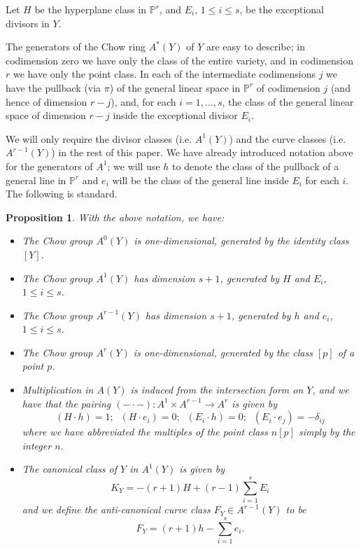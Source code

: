 \documentclass[12pt]{article}
\newtheorem{proposition}[equation]{Proposition}
\numberwithin{equation}{section}
\numberwithin{subeq}{equation}
\def\bbP{\mathbb{P}}
\begin{document}
Let $H$ be the hyperplane class in $\bbP^r$,
and $E_i$, $1 \leq i \leq s$, be the exceptional divisors in $Y$.

The generators of the Chow ring $A^*(Y)$ of $Y$ are easy to describe;
in codimension zero we have only the class of the entire variety,
and in codimension $r$ we have only the point class.
In each of the intermediate codimensions $j$
we have the pullback (via $\pi$) of the general linear space in $\bbP^r$ of codimension $j$
(and hence of dimension $r-j$),
and, for each $i = 1,\ldots,s$,
the class of the general linear space of dimension $r-j$ inside the exceptional divisor $E_i$.

We will only require the divisor classes (i.e. $A^1(Y)$)
and the curve classes (i.e. $A^{r-1}(Y)$) in the rest of this paper.
We have already introduced notation above for the generators of $A^1$;
we will use $h$ to denote the class of the pullback of a general line in $\bbP^r$
and $e_i$ will be the class of the general line inside $E_i$ for each $i$.
The following is standard.

\begin{proposition}\label{antican}
With the above notation, we have:
\begin{itemize}
\item[(a)] The Chow group $A^0(Y)$ is one-dimensional, generated by the identity class $[Y]$.
\item[(b)] The Chow group $A^1(Y)$ has dimension $s+1$, generated by $H$ and $E_i$, $1\leq i \leq s$.
\item[(c)] The Chow group $A^{r-1}(Y)$ has dimension $s+1$, generated by $h$ and $e_i$, $1\leq i \leq s$.
\item[(d)] The Chow group $A^r(Y)$ is one-dimensional, generated by the class $[p]$ of a point $p$.
\item[(f)] Multiplication in $A(Y)$ is induced from the intersection form on $Y$,
and we have that the pairing $(-\cdot -): A^1 \times A^{r-1} \to A^r$ is given by
\[
(H \cdot h) = 1; \;\; (H\cdot e_i) = 0; \;\; (E_i \cdot h) = 0; \;\; (E_i \cdot e_j) = -\delta_{ij}
\]
where we have abbreviated the multiples of the point class $n[p]$ simply by the integer $n$.
\item[(g)] The canonical class of $Y$ in $A^1(Y)$ is given by
\[
K_Y = -(r+1) H + (r-1) \sum_{i=1}^s E_i
\]
and we define the \emph{anti-canonical curve class} $F_Y \in A^{r-1}(Y)$ to be
\[
F_Y = (r+1) h - \sum_{i=1}^s e_i.
\]
\end{itemize}
\end{proposition}
\end{document}
